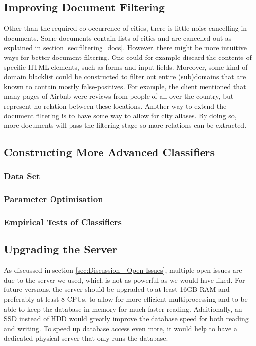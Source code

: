 \subsection{Improving Document Filtering}
Other than the required co-occurrence of cities, there is little noise cancelling in documents. Some documents contain lists of cities and are cancelled out as explained in section \ref{sec:filtering_docs}. However, there might be more intuitive ways for better document filtering. One could for example discard the contents of specific HTML elements, such as forms and input fields. Moreover, some kind of domain blacklist could be constructed to filter out entire (sub)domains that are known to contain mostly false-positives. For example, the client mentioned that many pages of Airbnb were reviews from people of all over the country, but represent no relation between these locations. Another way to extend the document filtering is to have some way to allow for city aliases. By doing so, more documents will pass the filtering stage so more relations can be extracted.

\subsection{Constructing More Advanced Classifiers}

\subsubsection{Data Set}
\subsubsection{Parameter Optimisation}
\subsubsection{Empirical Tests of Classifiers}

\subsection{Upgrading the Server}
As discussed in section \ref{sec:Discussion - Open Issues}, multiple open issues are due to the server we used, which is not as powerful as we would have liked. For future versions, the server should be upgraded to at least 16GB RAM and preferably at least 8 CPUs, to allow for more efficient multiprocessing and to be able to keep the database in memory for much faster reading. Additionally, an SSD instead of HDD would greatly improve the database speed for both reading and writing. To speed up database access even more, it would help to have a dedicated physical server that only runs the database.

